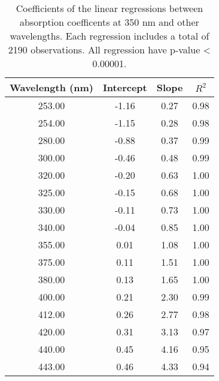 \begin{table}[ht]
\centering
\begin{tabular}{cccc}
  \hline
Wavelength (nm) & Intercept & Slope & $R^2$ \\ 
  \hline
253.00 & -1.16 & 0.27 & 0.98 \\ 
  254.00 & -1.15 & 0.28 & 0.98 \\ 
  280.00 & -0.88 & 0.37 & 0.99 \\ 
  300.00 & -0.46 & 0.48 & 0.99 \\ 
  320.00 & -0.20 & 0.63 & 1.00 \\ 
  325.00 & -0.15 & 0.68 & 1.00 \\ 
  330.00 & -0.11 & 0.73 & 1.00 \\ 
  340.00 & -0.04 & 0.85 & 1.00 \\ 
  355.00 & 0.01 & 1.08 & 1.00 \\ 
  375.00 & 0.11 & 1.51 & 1.00 \\ 
  380.00 & 0.13 & 1.65 & 1.00 \\ 
  400.00 & 0.21 & 2.30 & 0.99 \\ 
  412.00 & 0.26 & 2.77 & 0.98 \\ 
  420.00 & 0.31 & 3.13 & 0.97 \\ 
  440.00 & 0.45 & 4.16 & 0.95 \\ 
  443.00 & 0.46 & 4.33 & 0.94 \\ 
   \hline
\end{tabular}
\caption{Coefficients of the linear regressions between absorption 
coefficents at 350 nm and other wavelengths. Each regression includes a total 
of 2190 observations. All regression have p-value < 0.00001.} 
\end{table}
